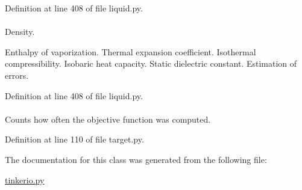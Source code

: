 \-Definition at line 408 of file liquid.\-py.

\hypertarget{classforcebalance_1_1liquid_1_1Liquid_a677f8c01349a91716e10353633a4c5c1}{
\paragraph[{w\-\_\-rho}]{}}\label{classforcebalance_1_1liquid_1_1Liquid_a677f8c01349a91716e10353633a4c5c1}


\-Density. 

\-Enthalpy of vaporization. \-Thermal expansion coefficient. \-Isothermal compressibility. \-Isobaric heat capacity. \-Static dielectric constant. \-Estimation of errors. 

\-Definition at line 408 of file liquid.\-py.

\hypertarget{classforcebalance_1_1target_1_1Target_ad4cd0ab38d8fc97d3e7a6e22ce130a16}{
\paragraph[{xct}]{}}\label{classforcebalance_1_1target_1_1Target_ad4cd0ab38d8fc97d3e7a6e22ce130a16}


\-Counts how often the objective function was computed. 



\-Definition at line 110 of file target.\-py.



\-The documentation for this class was generated from the following file\-:\begin{DoxyCompactItemize}
\item 
\hyperlink{tinkerio_8py}{tinkerio.\-py}\end{DoxyCompactItemize}
